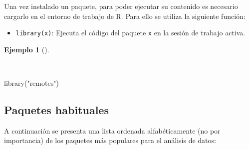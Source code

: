 \documentclass[
  a4paper,
]{scrreport}
\newenvironment{Shaded}{\begin{snugshade}}{\end{snugshade}}
\newcommand{\FunctionTok}[1]{\textcolor[rgb]{0.28,0.35,0.67}{#1}}
\newcommand{\NormalTok}[1]{\textcolor[rgb]{0.00,0.23,0.31}{#1}}
\newcommand{\StringTok}[1]{\textcolor[rgb]{0.13,0.47,0.30}{#1}}
\providecommand{\tightlist}{%
  \setlength{\itemsep}{0pt}\setlength{\parskip}{0pt}}\usepackage{longtable,booktabs,array}
\theoremstyle{definition}
\theoremstyle{definition}
\newtheorem{example}{Ejemplo}[chapter]
\theoremstyle{remark}
\begin{document}
Una vez instalado un paquete, para poder ejecutar su contenido es
necesario cargarlo en el entorno de trabajo de R. Para ello se utiliza
la siguiente función:

\begin{itemize}
\tightlist
\item
  \texttt{library(x)}: Ejecuta el código del paquete \texttt{x} en la
  sesión de trabajo activa.
\end{itemize}

\begin{example}[]\protect\hypertarget{exm-carga-paquetes}{}\label{exm-carga-paquetes}

~

\begin{Shaded}
\begin{Highlighting}[]
\FunctionTok{library}\NormalTok{(}\StringTok{"remotes"}\NormalTok{)}
\end{Highlighting}
\end{Shaded}

\end{example}

\subsection{Paquetes habituales}\label{paquetes-habituales}

A continuación se presenta una lista ordenada alfabéticamente (no por
importancia) de los paquetes más populares para el análisis de datos:
\end{document}

